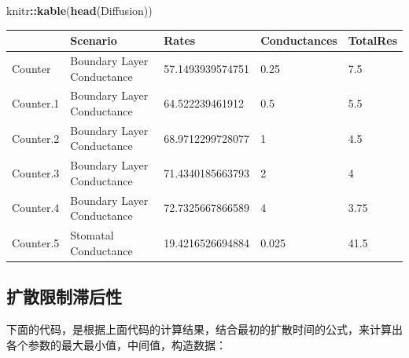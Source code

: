 \documentclass[
]{krantz}
\makeatletter
\newenvironment{Shaded}{\begin{snugshade}}{\end{snugshade}}
\newcommand{\KeywordTok}[1]{\textcolor[rgb]{0.13,0.29,0.53}{\textbf{#1}}}
\newcommand{\NormalTok}[1]{#1}
\newcommand{\OperatorTok}[1]{\textcolor[rgb]{0.81,0.36,0.00}{\textbf{#1}}}
\newenvironment{kframe}{%
\medskip{}
\setlength{\fboxsep}{.8em}
 \def\at@end@of@kframe{}%
 \ifinner\ifhmode%
  \def\at@end@of@kframe{\end{minipage}}%
  \begin{minipage}{\columnwidth}%
 \fi\fi%
 \def\FrameCommand##1{\hskip\@totalleftmargin \hskip-\fboxsep
 \colorbox{shadecolor}{##1}\hskip-\fboxsep
     \hskip-\linewidth \hskip-\@totalleftmargin \hskip\columnwidth}%
 \MakeFramed {\advance\hsize-\width
   \@totalleftmargin\z@ \linewidth\hsize
   \@setminipage}}%
 {\par\unskip\endMakeFramed%
 \at@end@of@kframe}
\renewenvironment{Shaded}{\begin{kframe}}{\end{kframe}}
\makeatother
\begin{document}
\begin{Shaded}
\begin{Highlighting}[]
\NormalTok{knitr}\OperatorTok{::}\KeywordTok{kable}\NormalTok{(}\KeywordTok{head}\NormalTok{(Diffusion))}
\end{Highlighting}
\end{Shaded}

\begin{tabular}{l|l|l|l|l}
\hline
  & Scenario & Rates & Conductances & TotalRes\\
\hline
Counter & Boundary Layer Conductance & 57.1493939574751 & 0.25 & 7.5\\
\hline
Counter.1 & Boundary Layer Conductance & 64.522239461912 & 0.5 & 5.5\\
\hline
Counter.2 & Boundary Layer Conductance & 68.9712299728077 & 1 & 4.5\\
\hline
Counter.3 & Boundary Layer Conductance & 71.4340185663793 & 2 & 4\\
\hline
Counter.4 & Boundary Layer Conductance & 72.7325667866589 & 4 & 3.75\\
\hline
Counter.5 & Stomatal Conductance & 19.4216526694884 & 0.025 & 41.5\\
\hline
\end{tabular}

\hypertarget{multi12}{%
\subsection{扩散限制滞后性}\label{multi12}}

下面的代码，是根据上面代码的计算结果，结合最初的扩散时间的公式，来计算出各个参数的最大最小值，中间值，构造数据：
\end{document}
